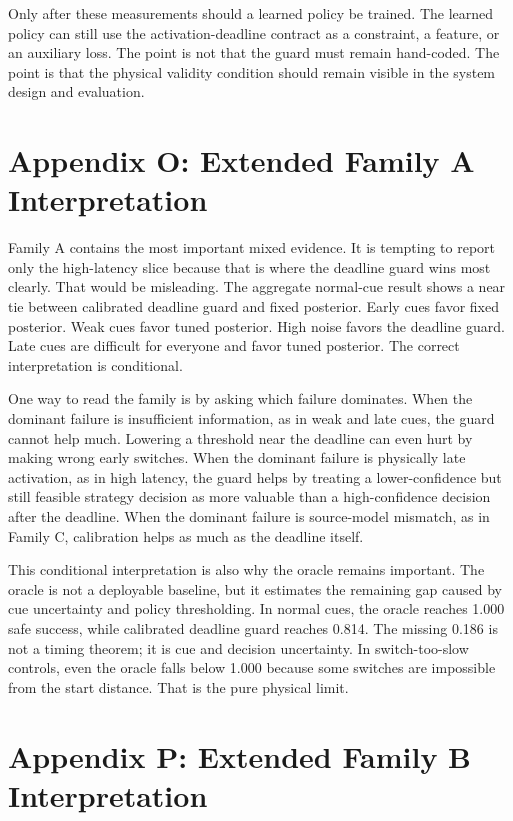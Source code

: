 \documentclass{article}
\begin{document}
Only after these measurements should a learned policy be trained. The learned policy can still use the activation-deadline contract as a constraint, a feature, or an auxiliary loss. The point is not that the guard must remain hand-coded. The point is that the physical validity condition should remain visible in the system design and evaluation.

\section{Appendix O: Extended Family A Interpretation}

Family A contains the most important mixed evidence. It is tempting to report only the high-latency slice because that is where the deadline guard wins most clearly. That would be misleading. The aggregate normal-cue result shows a near tie between calibrated deadline guard and fixed posterior. Early cues favor fixed posterior. Weak cues favor tuned posterior. High noise favors the deadline guard. Late cues are difficult for everyone and favor tuned posterior. The correct interpretation is conditional.

One way to read the family is by asking which failure dominates. When the dominant failure is insufficient information, as in weak and late cues, the guard cannot help much. Lowering a threshold near the deadline can even hurt by making wrong early switches. When the dominant failure is physically late activation, as in high latency, the guard helps by treating a lower-confidence but still feasible strategy decision as more valuable than a high-confidence decision after the deadline. When the dominant failure is source-model mismatch, as in Family C, calibration helps as much as the deadline itself.

This conditional interpretation is also why the oracle remains important. The oracle is not a deployable baseline, but it estimates the remaining gap caused by cue uncertainty and policy thresholding. In normal cues, the oracle reaches 1.000 safe success, while calibrated deadline guard reaches 0.814. The missing 0.186 is not a timing theorem; it is cue and decision uncertainty. In switch-too-slow controls, even the oracle falls below 1.000 because some switches are impossible from the start distance. That is the pure physical limit.

\section{Appendix P: Extended Family B Interpretation}
\end{document}
